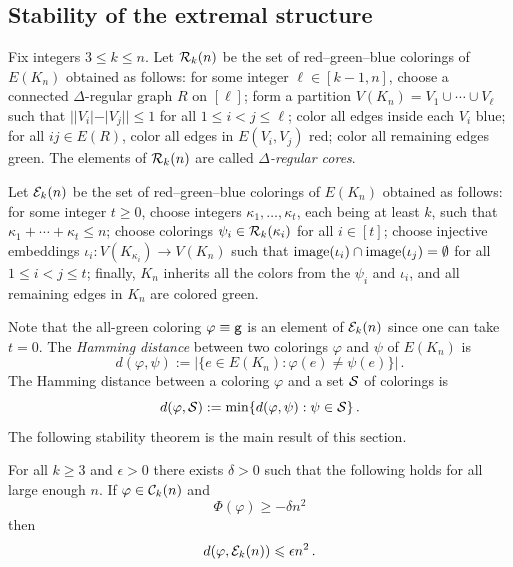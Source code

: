 \subsection{Stability of the extremal structure}
\begin{definition}\label{dfn:d-regular-cores}
Fix integers $3\leq k\leq n$. Let ${\mathcal R}_k(n)$ be the set of red--green--blue colorings of $E(K_n)$ obtained as follows: for some integer $\ell\in[k-1,n]$, choose a connected $\Delta$-regular graph $R$ on $[\ell]$; form a partition $V(K_n)=V_1\cup\cdots\cup V_\ell$ such that $||V_i|-|V_j||\leq1$ for all $1\leq i<j\leq \ell$; color all edges inside each $V_i$ blue; for all $ij\in E(R)$, color all edges in $E(V_i,V_j)$ red; color all remaining edges green. The elements of ${\mathcal R}_k(n)$ are called \emph{$\Delta$-regular cores}.
\end{definition}

\begin{definition}\label{dfn:k1k-extremal-fam}
Let ${\mathcal E}_k(n)$ be the set of red--green--blue colorings of $E(K_n)$ obtained as follows: for some integer $t\geq0$, choose integers $\kappa_1,\dots,\kappa_t$, each being at least $k$, such that $\kappa_1+\cdots+\kappa_t\leq n$; choose colorings $\psi_i\in{\mathcal R}_k(\kappa_i)$ for all $i\in[t]$; choose injective embeddings $\iota_i:V(K_{\kappa_i})\to V(K_n)$ such that $\operatorname{image}(\iota_i)\cap\operatorname{image}(\iota_j)=\emptyset$ for all $1\leq i<j\leq t$; finally, $K_n$ inherits all the colors from the $\psi_i$ and $\iota_i$, and all remaining edges in $K_n$ are colored green.
\end{definition}

Note that the all-green coloring $\varphi\equiv{\normalfont\texttt g}$ is an element of ${\mathcal E}_k(n)$ since one can take $t=0$.
The \emph{Hamming distance} between two colorings $\varphi$ and $\psi$ of $E(K_n)$ is
$$d(\varphi,\psi):=|\{e\in E(K_n):\varphi(e)\neq\psi(e)\}|\,.$$
The Hamming distance between a coloring $\varphi$ and a set ${\mathcal S}$ of colorings is
$$d(\varphi,{\mathcal S}):=\min\{d(\varphi,\psi):\psi\in{\mathcal S}\}\,.$$
The following stability theorem is the main result of this section.

\begin{theorem}\label{thm:kth-order-stability}
For all $k\geq3$ and $\epsilon>0$ there exists $\delta>0$ such that the following holds for all large enough $n$. If $\varphi\in{\mathcal C}_k(n)$ and
\begin{equation}\label{eqn:near-extremality}
\Phi(\varphi)\geq-\delta n^2
\end{equation}
then
$$d(\varphi,{\mathcal E}_k(n))\leqslant\epsilon n^2\,.$$
\end{theorem}

